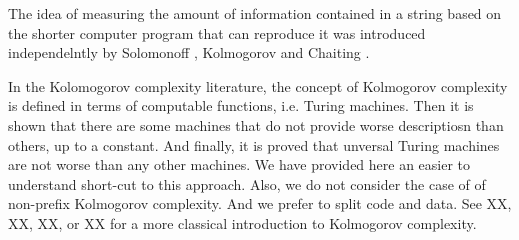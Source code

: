 The idea of measuring the amount of information contained in a string based on the shorter computer program that can reproduce it was introduced independelntly by Solomonoff \cite{solomonoff1964formal}, Kolmogorov \cite{kolmogorov1965three} and Chaiting \cite{chaitin1969simplicity}.

In the Kolomogorov complexity literature, the concept of Kolmogorov complexity is defined in terms of computable functions, i.e. Turing machines. Then it is shown that there are some machines that do not provide worse descriptiosn than others, up to a constant. And finally, it is proved that unversal Turing machines are not worse than any other machines. We have provided here an easier to understand short-cut to this approach. Also, we do not consider the case of of non-prefix Kolmogorov complexity. And we prefer to split code and data. See XX, XX, XX, or XX for a more classical introduction to Kolmogorov complexity.

